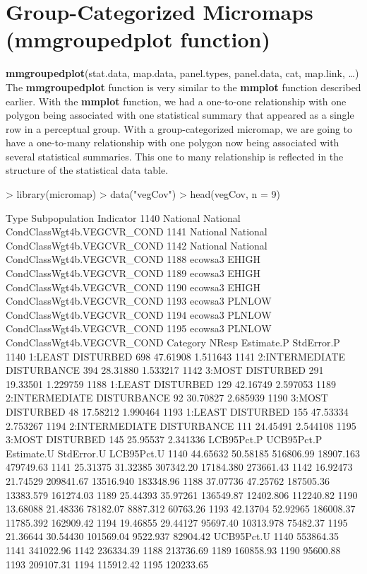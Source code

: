 \documentclass{article}
\begin{document}
\section{Group-Categorized Micromaps (mmgroupedplot function)}
\textbf{mmgroupedplot}(stat.data, map.data, panel.types, panel.data, cat, map.link, \ldots)
\noindent The \textbf{mmgroupedplot} function is very similar to the \textbf{mmplot} function described earlier.  With the \textbf{mmplot} function, we had a one-to-one relationship with one polygon being associated with one statistical summary that appeared as a single row in a perceptual group.  With a group-categorized micromap, we are going to have a one-to-many relationship with one polygon now being associated with several statistical summaries.  This one to many relationship is reflected in the structure of the statistical data table.
\begin{Schunk}
\begin{Sinput}
> library(micromap)
> data("vegCov")
> head(vegCov, n = 9)
\end{Sinput}
\begin{Soutput}
         Type Subpopulation                  Indicator
1140 National      National CondClassWgt4b.VEGCVR_COND
1141 National      National CondClassWgt4b.VEGCVR_COND
1142 National      National CondClassWgt4b.VEGCVR_COND
1188  ecowsa3         EHIGH CondClassWgt4b.VEGCVR_COND
1189  ecowsa3         EHIGH CondClassWgt4b.VEGCVR_COND
1190  ecowsa3         EHIGH CondClassWgt4b.VEGCVR_COND
1193  ecowsa3        PLNLOW CondClassWgt4b.VEGCVR_COND
1194  ecowsa3        PLNLOW CondClassWgt4b.VEGCVR_COND
1195  ecowsa3        PLNLOW CondClassWgt4b.VEGCVR_COND
                       Category NResp Estimate.P StdError.P
1140          1:LEAST DISTURBED   698   47.61908   1.511643
1141 2:INTERMEDIATE DISTURBANCE   394   28.31880   1.533217
1142           3:MOST DISTURBED   291   19.33501   1.229759
1188          1:LEAST DISTURBED   129   42.16749   2.597053
1189 2:INTERMEDIATE DISTURBANCE    92   30.70827   2.685939
1190           3:MOST DISTURBED    48   17.58212   1.990464
1193          1:LEAST DISTURBED   155   47.53334   2.753267
1194 2:INTERMEDIATE DISTURBANCE   111   24.45491   2.544108
1195           3:MOST DISTURBED   145   25.95537   2.341336
     LCB95Pct.P UCB95Pct.P Estimate.U StdError.U LCB95Pct.U
1140   44.65632   50.58185  516806.99  18907.163  479749.63
1141   25.31375   31.32385  307342.20  17184.380  273661.43
1142   16.92473   21.74529  209841.67  13516.940  183348.96
1188   37.07736   47.25762  187505.36  13383.579  161274.03
1189   25.44393   35.97261  136549.87  12402.806  112240.82
1190   13.68088   21.48336   78182.07   8887.312   60763.26
1193   42.13704   52.92965  186008.37  11785.392  162909.42
1194   19.46855   29.44127   95697.40  10313.978   75482.37
1195   21.36644   30.54430  101569.04   9522.937   82904.42
     UCB95Pct.U
1140  553864.35
1141  341022.96
1142  236334.39
1188  213736.69
1189  160858.93
1190   95600.88
1193  209107.31
1194  115912.42
1195  120233.65
\end{Soutput}
\end{Schunk}
\end{document}
